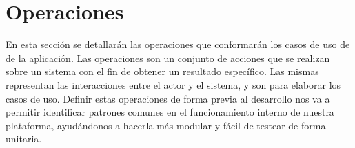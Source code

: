 
\section{Operaciones}\label{sec:operaciones}

En esta sección se detallarán las operaciones que conformarán los casos de uso de de la aplicación. Las operaciones son un conjunto de acciones que se realizan sobre un sistema con el fin de obtener un resultado específico. Las mismas representan las interacciones entre el actor y el sistema, y son  para elaborar los casos de uso. Definir estas operaciones de forma previa al desarrollo nos va a permitir identificar patrones comunes en el funcionamiento interno de nuestra plataforma, ayudándonos a hacerla más modular y fácil de testear de forma unitaria.

